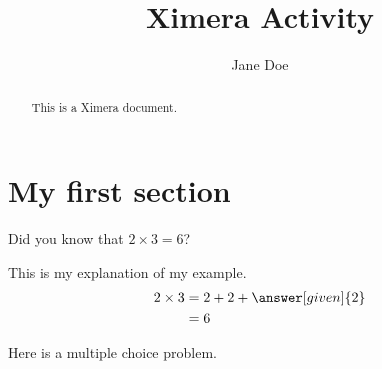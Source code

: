 \documentclass{ximera}
\title{Ximera Activity}
\author{Jane Doe}
\begin{document}
\begin{abstract}
    This is a Ximera document.
\end{abstract}
\maketitle

\section{My first section}

\begin{example}
Did you know that $2\times 3 = 6$?
\begin{explanation}
This is my explanation of my example.
\begin{align*}
    2\times 3 &= 2 + 2 + \answer[given]{2}\\
    &= 6
\end{align*}
\end{explanation}
\end{example}

\begin{problem}
Here is a multiple choice problem.
\begin{multipleChoice}
\end{multipleChoice}
\end{problem}

\begin{exercise}
\begin{selectAll}
\end{selectAll}
\end{exercise}
\end{document}
